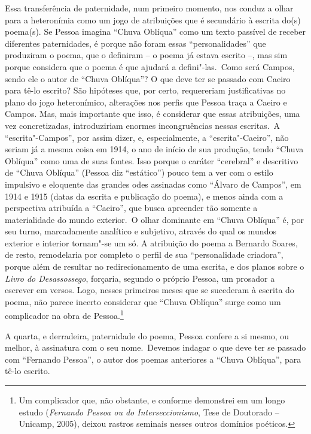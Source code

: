 Essa transferência de paternidade, num primeiro momento, nos conduz a
olhar para a heteronímia como um jogo de atribuições que é secundário à
escrita do(s) poema(s). Se Pessoa imagina ``Chuva Oblíqua'' como um
texto passível de receber diferentes paternidades, é porque não foram
essas ``personalidades'' que produziram o poema, que o definiram -- o
poema já estava escrito --, mas sim porque considera que o poema é que
ajudará a defini"-las.~Como será Campos, sendo ele o autor de ``Chuva
Oblíqua''? O que deve ter se passado com Caeiro para tê-lo escrito? São
hipóteses que, por certo, requereriam justificativas no plano do jogo
heteronímico, alterações nos perfis que Pessoa traça a Caeiro e Campos.
Mas, mais importante que isso, é considerar que essas atribuições, uma
vez concretizadas, introduziriam enormes incongruências nessas escritas.~A ``escrita"-Campos'', por assim dizer, e, especialmente, a ``escrita"-Caeiro'', não seriam já a mesma coisa em 1914, o ano de início
de sua produção, tendo ``Chuva Oblíqua'' como uma de suas fontes. Isso
porque o caráter ``cerebral'' e descritivo de ``Chuva Oblíqua'' (Pessoa
diz ``estático'') pouco tem a ver com o estilo impulsivo e eloquente das
grandes odes assinadas como ``Álvaro de Campos'', em 1914 e 1915 (datas
da escrita e publicação do poema), e menos ainda com a perspectiva
atribuída a ``Caeiro'', que busca apreender tão somente a materialidade
do mundo exterior.~O olhar dominante em ``Chuva Oblíqua'' é, por seu
turno, marcadamente analítico e subjetivo, através do qual os mundos
exterior e interior tornam"-se um só. A atribuição do poema a Bernardo
Soares, de resto, remodelaria por completo o perfil de sua
``personalidade criadora'', porque além de resultar no redirecionamento
de uma escrita, e dos planos sobre o \emph{Livro do Desassossego},
forçaria, segundo o próprio Pessoa, um prosador a escrever em versos.
Logo, nesses primeiros meses que se sucederam à escrita do poema, não
parece incerto considerar que ``Chuva Oblíqua'' surge como um
complicador na obra de Pessoa.\footnote{Um complicador que, não
  obstante, e conforme demonstrei em um longo estudo (\emph{Fernando
  Pessoa ou do Interseccionismo}, Tese de Doutorado -- Unicamp, 2005),
  deixou rastros seminais nesses outros domínios poéticos.}

A quarta, e derradeira, paternidade do poema, Pessoa confere a si mesmo,
ou melhor, à assinatura com o seu nome.~Devemos indagar o que deve ter
se passado com ``Fernando Pessoa'', o autor dos poemas anteriores a
``Chuva Oblíqua'', para tê-lo escrito.

